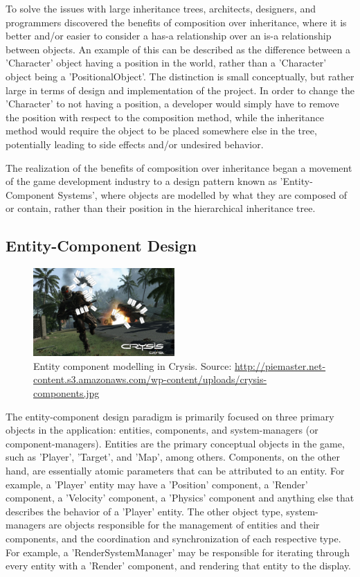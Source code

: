 To solve the issues with large inheritance trees, architects, designers, and programmers discovered\cite{haller2002generic} the benefits of composition over inheritance, where it is better and/or easier to consider a has-a relationship over an is-a relationship between objects. An example of this can be described as the difference between a 'Character' object having a position in the world, rather than a 'Character' object being a 'PositionalObject'. The distinction is small conceptually, but rather large in terms of design and implementation of the project. In order to change the 'Character' to not having a position, a developer would simply have to remove the position with respect to the composition method, while the inheritance method would require the object to be placed somewhere else in the tree, potentially leading to side effects and/or undesired behavior.

The realization of the benefits of composition over inheritance began a movement of the game development industry to a design pattern known as 'Entity-Component Systems', where objects are modelled by what they are composed of or contain, rather than their position in the hierarchical inheritance tree.

\subsection{Entity-Component Design}

\begin{figure}[h!]
  \centering \includegraphics[width=0.48\textwidth]{Images/crysis-components.jpg}
	\caption{Entity component modelling in Crysis. Source: \url{http://piemaster.net-content.s3.amazonaws.com/wp-content/uploads/crysis-components.jpg}}
\end{figure}

The entity-component design paradigm is primarily focused on three primary objects in the application: entities, components, and system-managers (or component-managers). Entities are the primary conceptual objects in the game, such as 'Player', 'Target', and 'Map', among others. Components, on the other hand, are essentially atomic parameters that can be attributed to an entity. For example, a 'Player' entity may have a 'Position' component, a 'Render' component, a 'Velocity' component, a 'Physics' component and anything else that describes the behavior of a 'Player' entity. The other object type, system-managers are objects responsible for the management of entities and their components, and the coordination and synchronization of each respective type. For example, a 'RenderSystemManager' may be responsible for iterating through every entity with a 'Render' component, and rendering that entity to the display.

